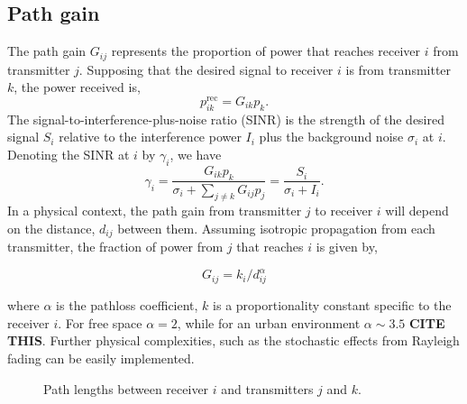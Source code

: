 \documentclass[twocolumn,secnumarabic,amssymb, nobibnotes, aps, prl,superscriptaddress]{revtex4-1}
\begin{document}
\subsection{Path gain}
The path gain $G_{ij}$ represents the proportion of power that reaches receiver $i$ from transmitter $j$. Supposing that the desired signal to receiver $i$ is from transmitter $k$, the power received is,
\begin{equation}
p_{ik}^{\text{rec}} = G_{ik}p_k.
\end{equation}
The signal-to-interference-plus-noise ratio (SINR) is the strength of the desired signal $S_i$ relative to the interference power $I_i$ plus the background noise $\sigma_i$ at $i$. Denoting the SINR at $i$ by $\gamma_i$, we have
\begin{equation}
\gamma_i = \frac{G_{ik}p_k}{\sigma_i+\sum_{j\neq k}G_{ij}p_j}
=\frac{S_i}{\sigma_i+I_i}.
\end{equation}
In a physical context, the path gain from transmitter $j$ to receiver $i$ will depend on the distance, $d_{ij}$ between them.  Assuming isotropic propagation from each transmitter, the fraction of power from $j$ that reaches $i$ is given by,

\begin{equation}
G_{ij} = k_i/d_{ij}^\alpha
\end{equation}

where $\alpha$ is the pathloss coefficient, $k$ is a proportionality constant specific to the receiver $i$.  For free space $\alpha = 2$, while for an urban environment $\alpha \sim 3.5$ \textbf{CITE THIS}.  Further physical complexities, such as the stochastic effects from Rayleigh fading can be easily implemented.

\begin{figure}[H]
\centering
{}
\caption{Path lengths between receiver $i$ and transmitters $j$ and $k$.}\label{fig:spatial_diagram}
\end{figure}
\end{document}
